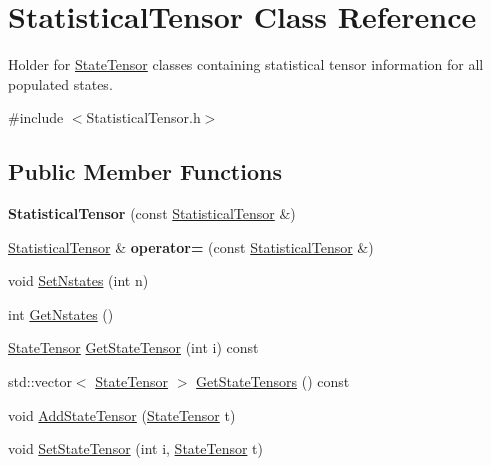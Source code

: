\hypertarget{classStatisticalTensor}{\section{Statistical\-Tensor Class Reference}
\label{classStatisticalTensor}
}


Holder for \hyperlink{classStateTensor}{State\-Tensor} classes containing statistical tensor information for all populated states.  




{\ttfamily \#include $<$Statistical\-Tensor.\-h$>$}

\subsection*{Public Member Functions}
\begin{DoxyCompactItemize}
\item 
\hypertarget{classStatisticalTensor_a3068d9b05d9e2fb02e89968869ce18ea}{{\bfseries Statistical\-Tensor} (const \hyperlink{classStatisticalTensor}{Statistical\-Tensor} \&)}\label{classStatisticalTensor_a3068d9b05d9e2fb02e89968869ce18ea}

\item 
\hypertarget{classStatisticalTensor_afaf35272339e33b9cedf06bd6cfb6a0a}{\hyperlink{classStatisticalTensor}{Statistical\-Tensor} \& {\bfseries operator=} (const \hyperlink{classStatisticalTensor}{Statistical\-Tensor} \&)}\label{classStatisticalTensor_afaf35272339e33b9cedf06bd6cfb6a0a}

\item 
void \hyperlink{classStatisticalTensor_a29b7d869efd527ea27ffc8aa9c30e7d5}{Set\-Nstates} (int n)
\item 
int \hyperlink{classStatisticalTensor_acfe377cf206cd2398b4b2906577d96c1}{Get\-Nstates} ()
\item 
\hyperlink{classStateTensor}{State\-Tensor} \hyperlink{classStatisticalTensor_a325e421b33247036151220df1dd688ad}{Get\-State\-Tensor} (int i) const 
\item 
std\-::vector$<$ \hyperlink{classStateTensor}{State\-Tensor} $>$ \hyperlink{classStatisticalTensor_abddf74499feeb18eb458d7e6f7c5c846}{Get\-State\-Tensors} () const 
\item 
void \hyperlink{classStatisticalTensor_a9c6b630b2b5ef343d175393d10b3d020}{Add\-State\-Tensor} (\hyperlink{classStateTensor}{State\-Tensor} t)
\item 
void \hyperlink{classStatisticalTensor_a306a2aa77470436c6dbb549a4ea396c8}{Set\-State\-Tensor} (int i, \hyperlink{classStateTensor}{State\-Tensor} t)
\end{DoxyCompactItemize}


